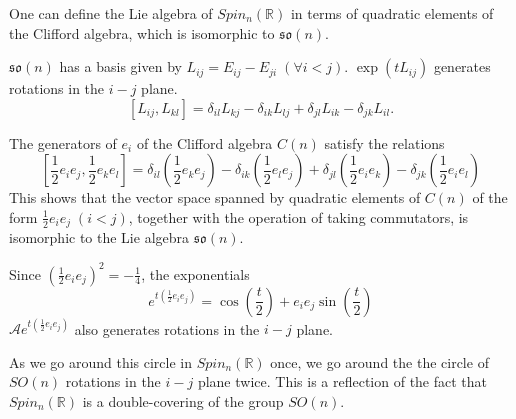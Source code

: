 \documentclass[11pt]{homework}
\begin{document}
\begin{proposition}
    One can define the Lie algebra of $Spin_n(\mathbb{R})$ in terms of quadratic elements of the Clifford algebra, which is isomorphic to $\mathfrak{so}(n)$. \cite{cliffalg32:online}
\end{proposition}

\begin{remark}
    $\mathfrak{so}(n)$ has a basis given by $L_{ij} = E_{ij} - E_{ji} \; (\forall i < j)$. $\exp \left(t L_{ij}\right) $ generates rotations in the $i-j$ plane.
    \begin{equation*}
        \left[L_{i j}, L_{k l}\right]=\delta_{i l} L_{k j}-\delta_{i k} L_{l j}+\delta_{j l} L_{i k}-\delta_{j k} L_{i l}.
    \end{equation*}

    The generators of $e_{i}$ of the Clifford algebra $C(n)$ satisfy the relations
    \begin{equation*}
        \left[\frac{1}{2} e_{i} e_{j}, \frac{1}{2} e_{k} e_{l}\right]=\delta_{i l}\left(\frac{1}{2} e_{k} e_{j}\right)-\delta_{i k}\left(\frac{1}{2} e_{l} e_{j}\right)+\delta_{j l}\left(\frac{1}{2} e_{i} e_{k}\right)-\delta_{j k}\left(\frac{1}{2} e_{i} e_{l}\right)
    \end{equation*}
    This shows that the vector space spanned by quadratic elements of $C(n)$ of the form $\frac{1}{2} e_{i} e_{j} \; (i<j)$, together with the operation of taking commutators, is isomorphic to the Lie algebra $\mathfrak{so}(n)$.

    Since $\left(\frac{1}{2} e_{i} e_{j}\right)^{2}=-\frac{1}{4}$, the exponentials
    \begin{equation*}
        e^{t \left(\frac{1}{2} e_{i} e_{j}\right)}=\cos \left(\frac{t}{2}\right)+e_{i} e_{j} \sin \left(\frac{t}{2}\right)
    \end{equation*}
    $\mathcal{A} e^{t \left(\frac{1}{2} e_{i} e_{j}\right)}$ also generates rotations in the $i-j$ plane.

    As we go around this circle in $Spin_n(\mathbb{R})$ once, we go around the the circle of $SO(n)$ rotations in the $i-j$ plane twice. This is a reflection of the fact that $Spin_n(\mathbb{R})$ is a double-covering of the group $SO(n)$.

\end{remark}


\nocite{Sepanski2007,Cohen1998}


\end{document}
